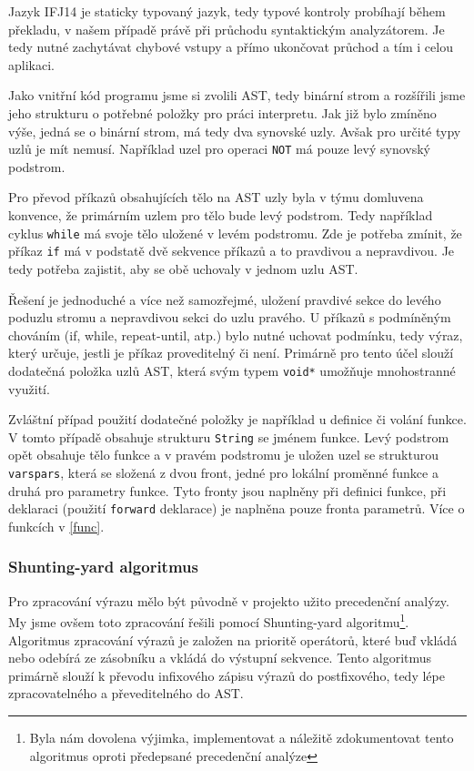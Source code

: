 \documentclass[12pt,a4paper,titlepage,final]{article}
\begin{document}
Jazyk IFJ14 je staticky typovaný jazyk, tedy typové kontroly probíhají během 
překladu, v našem případě právě při průchodu syntaktickým analyzátorem. Je tedy
nutné zachytávat chybové vstupy a přímo ukončovat průchod a tím i celou aplikaci.

Jako vnitřní kód programu jsme si zvolili AST, tedy binární strom a rozšířili jsme
jeho strukturu o potřebné položky pro práci interpretu. Jak již bylo zmíněno výše,
jedná se o binární strom, má tedy dva synovské uzly. Avšak pro určité typy uzlů
je mít nemusí. Například uzel pro operaci \verb|NOT| má pouze levý synovský podstrom.

Pro převod příkazů obsahujících tělo na AST uzly byla v týmu domluvena konvence,
že primárním uzlem pro tělo bude levý podstrom. Tedy například cyklus \verb|while|
má svoje tělo uložené v levém podstromu. Zde je potřeba zmínit, že příkaz \verb|if|
má v podstatě dvě sekvence příkazů a to pravdivou a nepravdivou. Je tedy potřeba
zajistit, aby se obě uchovaly v jednom uzlu AST.

Řešení je jednoduché a více než samozřejmé, uložení pravdivé sekce do levého
poduzlu stromu a nepravdivou sekci do uzlu pravého. U příkazů s podmíněným
chováním (if, while, repeat-until, atp.) bylo nutné uchovat podmínku, tedy výraz,
který určuje, jestli je příkaz proveditelný či není. Primárně pro tento účel
slouží dodatečná položka uzlů AST, která svým typem \verb|void*| umožňuje
mnohostranné využití. 

Zvláštní případ použití dodatečné položky je například u definice či volání funkce.
V tomto případě obsahuje strukturu \verb|String| se jménem funkce. Levý podstrom
opět obsahuje tělo funkce a v pravém podstromu je uložen uzel se strukturou \verb|varspars|,
která se složená z dvou front, jedné pro lokální proměnné funkce a druhá pro
parametry funkce. Tyto fronty jsou naplněny při definici funkce, při deklaraci
(použití \verb|forward| deklarace) je naplněna pouze fronta parametrů. Více o funkcích
v \ref{func}.

\subsubsection{Shunting-yard algoritmus}
\label{sya}
Pro zpracování výrazu mělo být původně v projekto užito precedenční analýzy. My jsme ovšem toto zpracování řešili pomocí Shunting-yard algoritmu\footnote{Byla nám
dovolena výjimka, implementovat a náležitě zdokumentovat tento algoritmus oproti předepsané
precedenční analýze}. Algoritmus zpracování výrazů je založen na prioritě operátorů, které buď vkládá
nebo odebírá ze zásobníku a vkládá do výstupní sekvence. Tento algoritmus primárně
slouží k převodu infixového zápisu výrazů do postfixového, tedy lépe zpracovatelného
a převeditelného do AST.
\end{document}
